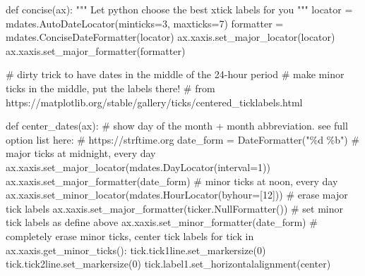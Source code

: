 \documentclass[
  letterpaper,
  DIV=11,
  numbers=noendperiod,
  oneside]{scrreprt}
\newenvironment{Shaded}{\begin{snugshade}}{\end{snugshade}}
\newcommand{\CommentTok}[1]{\textcolor[rgb]{0.37,0.37,0.37}{#1}}
\newcommand{\ControlFlowTok}[1]{\textcolor[rgb]{0.00,0.23,0.31}{#1}}
\newcommand{\DecValTok}[1]{\textcolor[rgb]{0.68,0.00,0.00}{#1}}
\newcommand{\KeywordTok}[1]{\textcolor[rgb]{0.00,0.23,0.31}{#1}}
\newcommand{\NormalTok}[1]{\textcolor[rgb]{0.00,0.23,0.31}{#1}}
\newcommand{\OperatorTok}[1]{\textcolor[rgb]{0.37,0.37,0.37}{#1}}
\newcommand{\SpecialCharTok}[1]{\textcolor[rgb]{0.37,0.37,0.37}{#1}}
\newcommand{\StringTok}[1]{\textcolor[rgb]{0.13,0.47,0.30}{#1}}
\begin{document}
\begin{Shaded}
\begin{Highlighting}[]
\KeywordTok{def}\NormalTok{ concise(ax):}
    \CommentTok{"""}
\CommentTok{    Let python choose the best xtick labels for you}
\CommentTok{    """}
\NormalTok{    locator }\OperatorTok{=}\NormalTok{ mdates.AutoDateLocator(minticks}\OperatorTok{=}\DecValTok{3}\NormalTok{, maxticks}\OperatorTok{=}\DecValTok{7}\NormalTok{)}
\NormalTok{    formatter }\OperatorTok{=}\NormalTok{ mdates.ConciseDateFormatter(locator)}
\NormalTok{    ax.xaxis.set\_major\_locator(locator)}
\NormalTok{    ax.xaxis.set\_major\_formatter(formatter)}

\CommentTok{\# dirty trick to have dates in the middle of the 24{-}hour period}
\CommentTok{\# make minor ticks in the middle, put the labels there!}
\CommentTok{\# from https://matplotlib.org/stable/gallery/ticks/centered\_ticklabels.html}

\KeywordTok{def}\NormalTok{ center\_dates(ax):}
    \CommentTok{\# show day of the month + month abbreviation. see full option list here:}
    \CommentTok{\# https://strftime.org}
\NormalTok{    date\_form }\OperatorTok{=}\NormalTok{ DateFormatter(}\StringTok{"}\SpecialCharTok{\%d}\StringTok{ \%b"}\NormalTok{)}
    \CommentTok{\# major ticks at midnight, every day}
\NormalTok{    ax.xaxis.set\_major\_locator(mdates.DayLocator(interval}\OperatorTok{=}\DecValTok{1}\NormalTok{))}
\NormalTok{    ax.xaxis.set\_major\_formatter(date\_form)}
    \CommentTok{\# minor ticks at noon, every day}
\NormalTok{    ax.xaxis.set\_minor\_locator(mdates.HourLocator(byhour}\OperatorTok{=}\NormalTok{[}\DecValTok{12}\NormalTok{]))}
    \CommentTok{\# erase major tick labels}
\NormalTok{    ax.xaxis.set\_major\_formatter(ticker.NullFormatter())}
    \CommentTok{\# set minor tick labels as define above}
\NormalTok{    ax.xaxis.set\_minor\_formatter(date\_form)}
    \CommentTok{\# completely erase minor ticks, center tick labels}
    \ControlFlowTok{for}\NormalTok{ tick }\KeywordTok{in}\NormalTok{ ax.xaxis.get\_minor\_ticks():}
\NormalTok{        tick.tick1line.set\_markersize(}\DecValTok{0}\NormalTok{)}
\NormalTok{        tick.tick2line.set\_markersize(}\DecValTok{0}\NormalTok{)}
\NormalTok{        tick.label1.set\_horizontalalignment(}\StringTok{\textquotesingle{}center\textquotesingle{}}\NormalTok{)}


\end{Highlighting}
\end{Shaded}
\end{document}
